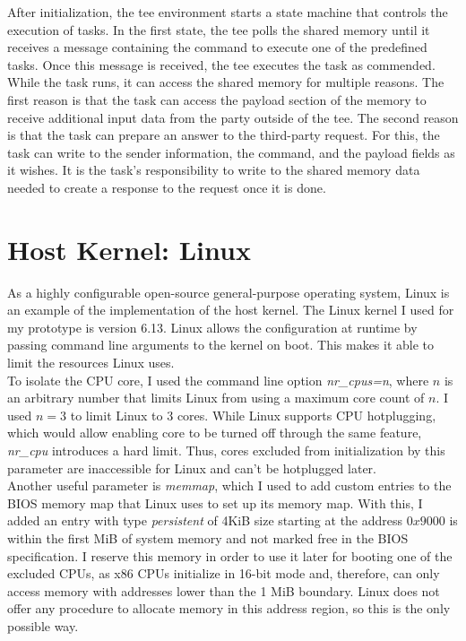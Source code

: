 After initialization, the \gls{tee} environment starts a state machine that
controls the execution of tasks. In the first state, the \gls{tee} polls the
shared memory until it receives a message containing the command to execute one
of the predefined tasks. Once this message is received, the \gls{tee} executes
the task as commended. While the task runs, it can access the shared memory for
multiple reasons. The first reason is that the task can access the payload
section of the memory to receive additional input data from the party outside of
the \gls{tee}. The second reason is that the task can prepare an answer to the
third-party request. For this, the task can write to the sender information, the
command, and the payload fields as it wishes. It is the task's responsibility to
write to the shared memory data needed to create a response to the request once
it is done.

\section{Host Kernel: Linux}
\label{sec:implementation:hostKernel}

As a highly configurable open-source general-purpose operating system, Linux is
an example of the implementation of the host kernel. The Linux kernel I used for
my prototype is version 6.13. Linux allows the configuration at runtime by
passing command line arguments to the kernel on boot. This makes it able to
limit the resources Linux uses. \\

To isolate the CPU core, I used the command line option \textit{nr\_cpus=n},
where $n$ is an arbitrary number that limits Linux from using a maximum core
count of $n$. I used $n=3$ to limit Linux to 3 cores. While Linux supports CPU
hotplugging, which would allow enabling core to be turned off through
the same feature, \textit{nr\_cpu} introduces a hard limit. Thus, cores excluded
from initialization by this parameter are inaccessible for Linux and can't be
hotplugged later. \\

Another useful parameter is \textit{memmap}, which I used to add custom entries
to the BIOS memory map that Linux uses to set up its memory map. With this, I
added an entry with type \textit{persistent} of 4KiB size starting at the
address $0x9000$ is within the first MiB of system memory and not marked free in
the BIOS specification. I reserve this memory in order to use it
later for booting one of the excluded CPUs, as x86 CPUs initialize in 16-bit
mode and, therefore, can only access memory with addresses lower than the 1 MiB
boundary. Linux does not offer any procedure to allocate memory in this address
region, so this is the only possible way. \\

